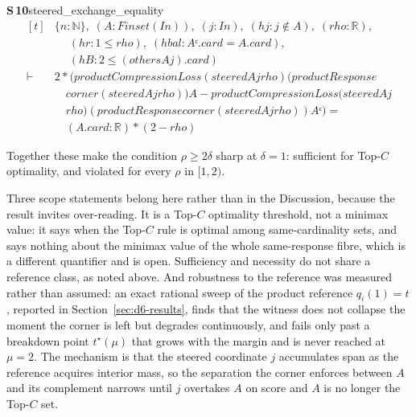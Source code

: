 \documentclass[conference]{IEEEtran}
\theoremstyle{definition}
\newcommand{\lean}[1]{\textsf{\footnotesize #1}}
\begin{document}
\noindent\textbf{S\,10}\quad\lean{steered\_exchange\_equality}
{\footnotesize\[ \begin{aligned}[t]
&\{ \mathit{n} : \mathbb{N} \},\; (\mathit{A} : \mathit{Finset} (\mathit{I} \mathit{n})),\; (\mathit{j} : \mathit{I} \mathit{n}),\; (\mathit{hj} : \mathit{j} \notin \mathit{A}),\; (\mathit{rho} : \mathbb{R} ),\\
&\quad \; (\mathit{hr} : 1 \leq \mathit{rho}),\; (\mathit{hbal} : \mathit{Aᶜ}.\mathit{card}=\mathit{A}.\mathit{card}),\\
&\quad \; (\mathit{hB} : 2 \leq (\mathit{others} \mathit{A} \mathit{j}).\mathit{card})\\
\vdash\;&2*(\mathit{productCompressionLoss} (\mathit{steered} \mathit{A} \mathit{j} \mathit{rho}) (\mathit{productResponse}\\
&\quad \mathit{corner} (\mathit{steered} \mathit{A} \mathit{j} \mathit{rho})) \mathit{A}- \mathit{productCompressionLoss} (\mathit{steered} \mathit{A} \mathit{j}\\
&\quad \mathit{rho}) (\mathit{productResponse} \mathit{corner} (\mathit{steered} \mathit{A} \mathit{j} \mathit{rho})) \mathit{Aᶜ})=\\
&\quad (\mathit{A}.\mathit{card}:\mathbb{R} )*(2-\mathit{rho})
\end{aligned} \]}


Together these make the condition $\rho\ge2\delta$ sharp at $\delta=1$: sufficient for
Top-$C$ optimality, and violated for every $\rho$ in $[1,2)$.

Three scope statements belong here rather than in the Discussion, because the result invites
over-reading. It is a Top-$C$ optimality threshold, not a minimax value: it says when the
Top-$C$ rule is optimal among same-cardinality sets, and says nothing about the minimax value
of the whole same-response fibre, which is a different quantifier and is open. Sufficiency and
necessity do not share a reference class, as noted above. And robustness to the reference
was measured rather than assumed: an exact rational sweep of the product reference
$q_{i}(1)=t$, reported in Section~\ref{sec:d6-results}, finds that the witness does not collapse
the moment the corner is left but degrades continuously, and fails only past a breakdown point
$t^{\star}(\mu)$ that grows with the margin and is never reached at $\mu=2$. The mechanism is
that the steered coordinate $j$ accumulates span as the reference acquires interior mass, so
the separation the corner enforces between $A$ and its complement narrows until $j$ overtakes
$A$ on score and $A$ is no longer the Top-$C$ set.
\end{document}
